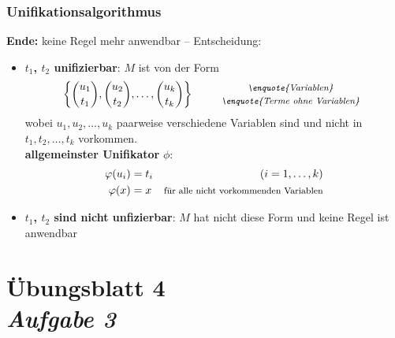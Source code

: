 \documentclass{beamer}
\begin{document}
\begin{frame} \frametitle{Unifikationsalgorithmus}
	\textbf{Ende:} keine Regel mehr anwendbar -- Entscheidung:
	\begin{itemize}
		\item \textbf{$t_1$, $t_2$ unifizierbar}: $M$ ist von der Form
		\begin{equation*}
			\menge{\binom{u_1}{t_1}, \binom{u_2}{t_2}, \dots, \binom{u_k}{t_k}} \qquad 
			\begin{array}{c} 
				\footnotesize \text{\textit{\enquote{Variablen}}} \\ 
				\footnotesize \text{\textit{\enquote{Terme ohne Variablen}}}
			\end{array}
		\end{equation*}
		wobei $u_1, u_2, \dots, u_k$ paarweise verschiedene Variablen sind und nicht in $t_1, t_2, \dots, t_k$ vorkommen.  \\
		\textbf{allgemeinster Unifikator} $\phi$: 
		\begin{equation*}
			\begin{aligned}
				\phi(u_i) &= t_i & (i = 1, \dots, k) \\
				\phi(x) &= x     & \footnotesize \text{für alle nicht vorkommenden Variablen}
			\end{aligned}
		\end{equation*}
		\item \textbf{$t_1$, $t_2$ sind nicht unfizierbar}: $M$ hat nicht diese Form und keine Regel ist anwendbar
	\end{itemize}
\end{frame}


\section{Übungsblatt 4 \\ \textit{\normalsize Aufgabe 3}}


\end{document}
